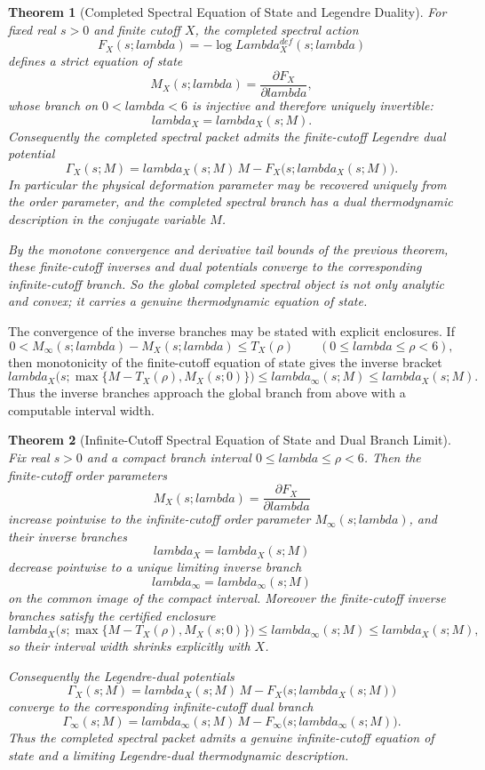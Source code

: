 \documentclass[12pt,a4paper]{article}
\def\mathrm#1{#1}%
\def\mathcal#1{#1}%
\def\lambda{lambda}%
\def\Lambda{Lambda}%
\newtheorem{theorem}{Theorem}[section]
\theoremstyle{definition}
\begin{document}
\begin{theorem}[Completed Spectral Equation of State and Legendre Duality]
For fixed real $s>0$ and finite cutoff $X$, the completed spectral action
\[
\mathcal F_X(s;\lambda)=-\log \Lambda_X^{\mathrm{def}}(s;\lambda)
\]
defines a strict equation of state
\[
\mathcal M_X(s;\lambda)=\frac{\partial \mathcal F_X}{\partial\lambda},
\]
whose branch on $0<\lambda<6$ is injective and therefore uniquely invertible:
\[
\lambda_X=\lambda_X(s;M).
\]
Consequently the completed spectral packet admits the finite-cutoff Legendre dual potential
\[
\Gamma_X(s;M)=\lambda_X(s;M)\,M-\mathcal F_X\bigl(s;\lambda_X(s;M)\bigr).
\]
In particular the physical deformation parameter may be recovered uniquely from the order parameter, and the completed spectral branch has a dual thermodynamic description in the conjugate variable $M$.

By the monotone convergence and derivative tail bounds of the previous theorem, these finite-cutoff inverses and dual potentials converge to the corresponding infinite-cutoff branch. So the global completed spectral object is not only analytic and convex; it carries a genuine thermodynamic equation of state.
\end{theorem}

The convergence of the inverse branches may be stated with explicit enclosures. If
\[
0<\mathcal M_\infty(s;\lambda)-\mathcal M_X(s;\lambda)\le T_X(\rho)
\qquad (0\le \lambda\le \rho<6),
\]
then monotonicity of the finite-cutoff equation of state gives the inverse bracket
\[
\lambda_X\bigl(s;\max\{M-T_X(\rho),\mathcal M_X(s;0)\}\bigr)
\le
\lambda_\infty(s;M)
\le
\lambda_X(s;M).
\]
Thus the inverse branches approach the global branch from above with a computable interval width.

\begin{theorem}[Infinite-Cutoff Spectral Equation of State and Dual Branch Limit]
Fix real $s>0$ and a compact branch interval $0\le\lambda\le\rho<6$. Then the finite-cutoff order parameters
\[
\mathcal M_X(s;\lambda)=\frac{\partial \mathcal F_X}{\partial\lambda}
\]
increase pointwise to the infinite-cutoff order parameter $\mathcal M_\infty(s;\lambda)$, and their inverse branches
\[
\lambda_X=\lambda_X(s;M)
\]
decrease pointwise to a unique limiting inverse branch
\[
\lambda_\infty=\lambda_\infty(s;M)
\]
on the common image of the compact interval. Moreover the finite-cutoff inverse branches satisfy the certified enclosure
\[
\lambda_X\bigl(s;\max\{M-T_X(\rho),\mathcal M_X(s;0)\}\bigr)
\le
\lambda_\infty(s;M)
\le
\lambda_X(s;M),
\]
so their interval width shrinks explicitly with $X$.

Consequently the Legendre-dual potentials
\[
\Gamma_X(s;M)=\lambda_X(s;M)\,M-\mathcal F_X\bigl(s;\lambda_X(s;M)\bigr)
\]
converge to the corresponding infinite-cutoff dual branch
\[
\Gamma_\infty(s;M)=\lambda_\infty(s;M)\,M-\mathcal F_\infty\bigl(s;\lambda_\infty(s;M)\bigr).
\]
Thus the completed spectral packet admits a genuine infinite-cutoff equation of state and a limiting Legendre-dual thermodynamic description.
\end{theorem}
\end{document}
